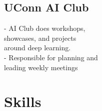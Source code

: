 \documentclass[]{resume-template}
\begin{document}
\begin{minipage}[t]{0.33\textwidth}
	\subsection{UConn AI Club}\label{subsec:uconn-ai-club}
	- AI Club does workshops,\\showcases, and projects \\around deep learning.\\
	- Responsible for planning and\\ leading weekly meetings\\
	\vspace{\topsep}






	\section{Skills}\label{sec:skills}

\end{minipage}
\end{document}
